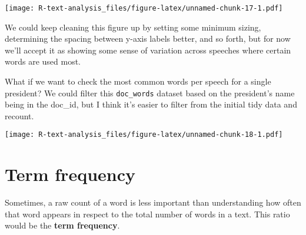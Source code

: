 \documentclass[]{book}
\newenvironment{Shaded}{\begin{snugshade}}{\end{snugshade}}
\newcommand{\DataTypeTok}[1]{\textcolor[rgb]{0.13,0.29,0.53}{#1}}
\newcommand{\DecValTok}[1]{\textcolor[rgb]{0.00,0.00,0.81}{#1}}
\newcommand{\KeywordTok}[1]{\textcolor[rgb]{0.13,0.29,0.53}{\textbf{#1}}}
\newcommand{\NormalTok}[1]{#1}
\newcommand{\OperatorTok}[1]{\textcolor[rgb]{0.81,0.36,0.00}{\textbf{#1}}}
\newcommand{\OtherTok}[1]{\textcolor[rgb]{0.56,0.35,0.01}{#1}}
\newcommand{\StringTok}[1]{\textcolor[rgb]{0.31,0.60,0.02}{#1}}
\begin{document}
\texttt{[image: R-text-analysis\_files/figure-latex/unnamed-chunk-17-1.pdf]}

We could keep cleaning this figure up by setting some minimum sizing, determining the spacing between y-axis labels better, and so forth, but for now we'll accept it as showing some sense of variation across speeches where certain words are used most.

What if we want to check the most common words per speech for a single president? We could filter this \texttt{doc\_words} dataset based on the president's name being in the doc\_id, but I think it's easier to filter from the initial tidy data and recount.

\begin{Shaded}
\end{Shaded}

\texttt{[image: R-text-analysis\_files/figure-latex/unnamed-chunk-18-1.pdf]}

\hypertarget{term-frequency}{%
\section{Term frequency}\label{term-frequency}}

Sometimes, a raw count of a word is less important than understanding how often that word appears in respect to the total number of words in a text. This ratio would be the \textbf{term frequency}.
\end{document}
